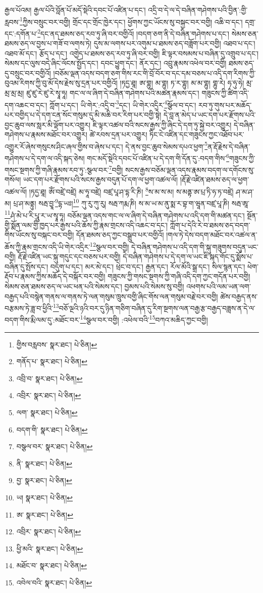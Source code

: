 རྒྱལ་པོའམ། རྒྱལ་པོའི་བློན་པོ་མདོ་སྡེའི་དབང་པོ་འཛིན་པ་དང་། འདྲི་བ་དེ་ལ་དེ་བཞིན་གཤེགས་པའི་བྱིན་:གྱི་རླབས་\footnote{གྱིས་བརླབས་  སྣར་ཐང་།  པེ་ཅིན། }ཀྱིས་བསྲུང་བར་བགྱི། གྲོང་དང་གྲོང་ཁྱེར་དང་། ཕྱོགས་ཀྱང་ཡོངས་སུ་བསྐྱང་བར་བགྱི། འཆི་བ་དང་། དགྲ་དང་:དགོན་པ་\footnote{གནོད་པ་  སྣར་ཐང་།  པེ་ཅིན། }དང་ནད་ཐམས་ཅད་རབ་ཏུ་ཞི་བར་བགྱིའོ། །བདག་ཅག་ནི་དེ་བཞིན་གཤེགས་པ་དང་། སེམས་ཅན་ཐམས་ཅད་ལ་བྱས་པ་གཟོ་བ་ལགས་ཏེ། དུས་མ་ལགས་པར་འགུམ་པ་ཐམས་ཅད་བཟློག་པར་བགྱི། འཐབ་པ་དང་། འཐབ་མོ་དང་། རྩོད་པ་དང་། འགྱེད་པ་ཐམས་ཅད་རབ་ཏུ་ཞི་བར་བགྱི། ཇི་ལྟར་བསམས་པ་བཞིན་དུ་འགྲུབ་པ་དང་། སེམས་དང་ལུས་བདེ་ཞིང་ལོངས་སྤྱོད་དང་། དབང་ཕྱུག་དང་། ནོར་དང་། འབྲུ་རྣམས་འཕེལ་བར་བགྱི། ཐམས་ཅད་དུ་བསྲུང་བར་བགྱིའོ། །བཅོམ་ལྡན་འདས་བདག་ཅག་གིས་རང་གི་བྲོ་བོར་བ་དང་དམ་བཅས་པ་འདི་དག་རིགས་ཀྱི་བུའམ་རིགས་ཀྱི་བུ་མོ་དེས་རྗེས་སུ་དྲན་པར་བགྱིའོ། །ཏདྱ་ཐཱ། ཨ་གྷུ། མ་གྷུ། ཏ་ར་གྷུ། མ་མ་གྷུ། གྷུ་རེ། ཧ་ཧུ་ཧེ། མྲ་མྲ་མྲ་མྲ། ཛུ་ཛུ་རེ་ཛུ་རེ་སྭཱ་ཧཱ། གང་ལ་ལ་ཞིག་དེ་བཞིན་གཤེགས་པའི་མཚན་རྣམས་དང་། གཟུངས་ཀྱི་ཚིག་འདི་དག་འཆང་བ་དང་། ཀློག་པ་དང་། ཡི་གེར་:འདྲི་བ་\footnote{འབྲི་བ་  སྣར་ཐང་།  པེ་ཅིན། }དང་། ཡི་གེར་འདྲིར་\footnote{འབྲིར་  སྣར་ཐང་།  པེ་ཅིན། }སྩོལ་བ་དང་། རབ་ཏུ་གུས་པར་མཆོད་པར་བགྱིད་པ་དེ་དག་ངན་སོང་གསུམ་དུ་མི་མཆི་བར་རིག་པར་བགྱི་སྟེ། དེ་བླ་ན་མེད་པ་ཡང་དག་པར་རྫོགས་པའི་བྱང་ཆུབ་ལས་སླར་མི་ལྡོག་པར་འགྱུར། ཇི་ལྟར་འཚལ་བའི་སངས་རྒྱས་ཀྱི་ཞིང་དེ་དག་ཏུ་སྐྱེ་བར་འགྱུར། དེ་བཞིན་གཤེགས་པ་རྣམས་མཐོང་བར་འགྱུར། ཚེ་རབས་དྲན་པར་འགྱུར། ཏིང་ངེ་འཛིན་དང་གཟུངས་ཀྱང་འཐོབ་པར་འགྱུར་རོ་ཞེས་གསུངས་ཤིང་ཞལ་གྱིས་བ་ཞེས་པ་དང་། དེ་ནས་བྱང་ཆུབ་སེམས་དཔའ་ཕྱག་\footnote{ལག་  སྣར་ཐང་།  པེ་ཅིན། }ན་རྡོ་རྗེས་དེ་བཞིན་གཤེགས་པ་དེ་དག་ལ་འདི་སྐད་ཅེས། གང་མདོ་སྡེའི་དབང་པོ་འཛིན་པ་དེ་དག་གི་དོན་དུ་:བདག་གིས་\footnote{བདག་གི་  སྣར་ཐང་།  པེ་ཅིན། }གཟུངས་ཀྱི་གསང་སྔགས་ཀྱི་གཞི་རྣམས་རབ་ཏུ་:སྩལ་བར་\footnote{བསྩལ་བར་  སྣར་ཐང་།  པེ་ཅིན། }བགྱི། སངས་རྒྱས་བཅོམ་ལྡན་འདས་རྣམས་བདག་ལ་དགོངས་སུ་གསོལ། ཡང་དག་པར་རྫོགས་པའི་སངས་རྒྱས་བདུན་པོ་དག་ལ་ཕྱག་འཚལ་ལོ། །རྡོ་རྗེ་འཛིན་ཐམས་ཅད་ལ་ཕྱག་འཚལ་ལོ། །ཏདྱ་ཐཱ། ཨོཾ་བཛྲེ་བཛྲེ། མ་ཧཱ་བཛྲེ། བཛྲ་པཱ་ཤ་དྷ་རི་ཎི། \footnote{ནི་  སྣར་ཐང་།  པེ་ཅིན། }ས་མ་ས་མ། ས་མནྟ་ཨ་པྲ་ཏི་ཧ་ཏ་བཛྲེ། ཤ་མ་ཤ་མ། པྲ་ཤ་མནྟུ། སརྦ་བྱཱ་\footnote{བྱ་  སྣར་ཐང་།  པེ་ཅིན། }དྷ་ཡཿ།\footnote{ཡ།  སྣར་ཐང་།  པེ་ཅིན། } ཀུ་རུ་ཀུ་རུ། སརྦ་ཀརྨ་ཎི། ས་མ་ཡ་མ་ནུ་སྨ་ར་བྷ་ག་ཝཱན་བཛྲ་པཱ་ཎི། སརྦ་ཨཱ་\footnote{ཨ་  སྣར་ཐང་།  པེ་ཅིན། }ཤཾ་མེ་པ་རི་པཱུ་ར་ཡ་སྭཱ་ཧཱ། བཅོམ་ལྡན་འདས་གང་ལ་ལ་ཞིག་དེ་བཞིན་གཤེགས་པ་འདི་དག་གི་མཚན་དང་། སྔོན་གྱི་སྨོན་ལམ་གྱི་ཁྱད་པར་རྒྱས་པའི་ཆོས་ཀྱི་རྣམ་གྲངས་འདི་འཆང་བ་དང་། ཀློག་པ་དེའི་རེ་བ་ཐམས་ཅད་བདག་གིས་ཡོངས་སུ་བསྐང་བར་བགྱི། དོན་ཐམས་ཅད་ཀྱང་བསྒྲུབ་པར་བགྱིའོ། །གལ་ཏེ་དེས་བདག་མཐོང་བར་འཚལ་ན་ཆོས་ཀྱི་རྣམ་གྲངས་འདི་ཡི་གེར་འདྲིར་\footnote{འབྲིར་  སྣར་ཐང་།  པེ་ཅིན། }སྩལ་བར་བགྱི། དེ་བཞིན་གཤེགས་པ་འདི་དག་གི་སྐུ་གཟུགས་བདུན་ཡང་བགྱི། རྡོ་རྗེ་འཛིན་ཡང་སྐུ་གདུང་དང་བཅས་པར་བགྱི། དེ་བཞིན་གཤེགས་པ་དེ་དག་ལ་ཡང་ཇི་སྐད་གོང་དུ་སྨོས་པ་བཞིན་དུ་སྤོས་དང་། བདུག་པ་དང་། མར་མེ་དང་། ཕྲེང་བ་དང་། རྒྱན་དང་། རོལ་མོའི་སྒྲ་དང་། སིལ་སྙན་དང་། ཕེག་རྡོབ་པ་རྣམས་ཀྱིས་མཆོད་དེ་བསྐོར་བར་བགྱི། གཟུངས་ཀྱི་གསང་སྔགས་ཀྱི་གཞི་འདི་དག་ཀྱང་གདོན་པར་བགྱི། སེམས་ཅན་ཐམས་ཅད་ལ་ཡང་ཕན་པའི་སེམས་དང་། བྱམས་པའི་སེམས་སུ་བགྱི། འཕགས་པའི་ལམ་ཡན་ལག་བརྒྱད་པའི་བསྙེན་གནས་ལ་གནས་ཏེ་ལན་གསུམ་ཁྲུས་བགྱི་ཞིང་གོས་ལན་གསུམ་བརྗེ་བར་བགྱི། ཚེས་བརྒྱད་ནས་བརྩམས་ཏེ་ཟླ་བ་ཕྱིའི་\footnote{ཕྱི་མའི་  སྣར་ཐང་།  པེ་ཅིན། }བཅོ་ལྔའི་ཉའི་བར་དུ་ཉིན་གཅིག་བཞིན་དུ་རིག་སྔགས་ལན་བརྒྱ་རྩ་བརྒྱད་བཟླས་ན་དེ་ལ་བདག་གིས་རྨི་ལམ་དུ་:མཐོང་བར་\footnote{མཐོང་བ་  སྣར་ཐང་།  པེ་ཅིན། }སྩལ་བར་བགྱི། :འཕེལ་བའི་\footnote{འབེལ་བའི་  སྣར་ཐང་།  པེ་ཅིན། }བཀའ་མཆིད་ཀྱང་བགྱི། 
